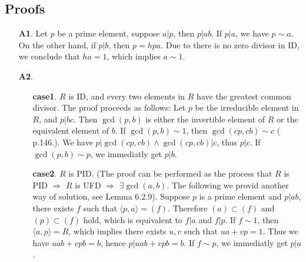 \subsection{Proofs}



\begin{enumerate}
    \item[\textbf{A1}.] Let $p$ be a prime element, suppose $a | p$, then $p | ab$. If $p | a$, we have $p \sim a$. On the other hand, if $p | b$, then $p = hpa$. Due to there is no zero divisor in ID, we conclude that $ha = 1$, which implies $a \sim 1$.
    

    \item[\textbf{A2}.]
    \begin{enumerate}
        \item[\textbf{case1}.] $R$ is ID, and every two elements in $R$ have the greatest common divisor. The proof proceeds as follows: Let $p$ be the irreducible element in $R$, and $p | bc$. Then $\gcd(p, b)$ is either the invertible element of $R$ or the equivalent element of $b$. If $\gcd(p, b) \sim 1$, then $\gcd(cp, cb) \sim c$ (\cite{Qiu_MA} p.146.). We have $p | \gcd(cp, cb) \land \gcd(cp, cb) | c$, thus $p | c$. If $\gcd(p, b) \sim p$, we immediatly get $p | b$.
        \item[\textbf{case2}.] $R$ is PID. (The proof can be performed as the process that $R$ is PID $\Rightarrow$ $R$ is UFD $\Rightarrow$ $\exists \gcd(a, b)$. The following we provid another way of solution, see \cite{LWW_AJN} Lemma 6.2.9). Suppose $p$ is a prime element and $p|ab$, there exists $f$ such that $\langle p, a \rangle = (f)$. Therefore $(a) \subset (f)$ and $(p) \subset (f)$ hold, which is equivalent to $f|a$ and $f|p$. If $f \sim 1$, then $\langle a, p \rangle = R$, which implies there exists $u, v$ such that $ua + vp = 1$. Thus we have $uab + vpb = b$, hence $p | uab + vpb = b$. If $f \sim p$, we immediatly get $p | a$.
    \end{enumerate}



\end{enumerate}
